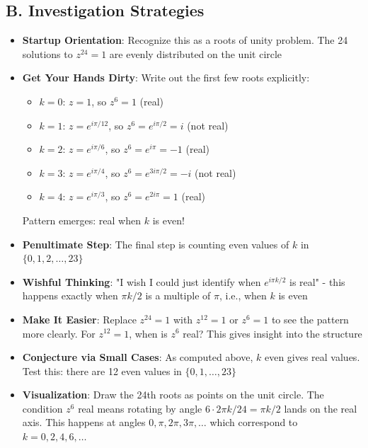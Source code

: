 \documentclass[]{article}
\begin{document}
\begin{strategicbox}
\subsection*{B. Investigation Strategies}
\begin{itemize}[leftmargin=*]
    \item \textbf{Startup Orientation}: Recognize this as a roots of unity problem. The 24 solutions to $z^{24} = 1$ are evenly distributed on the unit circle
    \item \textbf{Get Your Hands Dirty}: Write out the first few roots explicitly:
    \begin{itemize}
        \item $k=0$: $z = 1$, so $z^6 = 1$ (real) \checkmark
        \item $k=1$: $z = e^{i\pi/12}$, so $z^6 = e^{i\pi/2} = i$ (not real)
        \item $k=2$: $z = e^{i\pi/6}$, so $z^6 = e^{i\pi} = -1$ (real) \checkmark
        \item $k=3$: $z = e^{i\pi/4}$, so $z^6 = e^{3i\pi/2} = -i$ (not real)
        \item $k=4$: $z = e^{i\pi/3}$, so $z^6 = e^{2i\pi} = 1$ (real) \checkmark
    \end{itemize}
    Pattern emerges: real when $k$ is even!
    \item \textbf{Penultimate Step}: The final step is counting even values of $k$ in $\{0,1,2,\ldots,23\}$
    \item \textbf{Wishful Thinking}: "I wish I could just identify when $e^{i\pi k/2}$ is real" - this happens exactly when $\pi k/2$ is a multiple of $\pi$, i.e., when $k$ is even
    \item \textbf{Make It Easier}: Replace $z^{24}=1$ with $z^{12}=1$ or $z^6=1$ to see the pattern more clearly. For $z^{12}=1$, when is $z^6$ real? This gives insight into the structure
    \item \textbf{Conjecture via Small Cases}: As computed above, $k$ even gives real values. Test this: there are 12 even values in $\{0,1,\ldots,23\}$
    \item \textbf{Visualization}: Draw the 24th roots as points on the unit circle. The condition $z^6$ real means rotating by angle $6 \cdot 2\pi k/24 = \pi k/2$ lands on the real axis. This happens at angles $0, \pi, 2\pi, 3\pi, \ldots$ which correspond to $k = 0, 2, 4, 6, \ldots$
\end{itemize}


\end{strategicbox}
\end{document}
